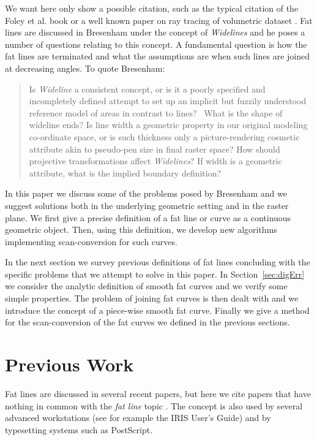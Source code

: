 \documentclass{egpubl}
\begin{document}
We want here only show a possible citation, such as the typical citation of
the Foley et al. book \cite{FolDamFeiHug.etal93} or a well known paper on ray
tracing of volumetric dataset \cite{Lev90}. Fat lines are discussed in
Bresenham under the concept of \emph{Widelines\/} and he poses a number of
questions relating to this concept. A fundamental question is how the fat
lines are terminated and what the assumptions are when such lines are joined
at decreasing angles. To quote Bresenham:
%
\begin{quote}
  Is \emph{Wideline\/} a consistent concept, or is it a poorly specified and
  incompletely defined attempt to set up an implicit but fuzzily understood
  reference model of areas in contrast to lines? \ What is the shape of
  wideline ends? Is line width a geometric property in our original modeling
  co-ordinate space, or is such thickness only a picture-rendering cosmetic
  attribute akin to pseudo-pen size in final raster space? How should
  projective transformations affect \emph{Widelines}? If width is a geometric
  attribute, what is the implied boundary definition?
\end{quote}
In this paper we discuss some of the problems posed by Bresenham and we
suggest solutions both in the underlying geometric setting and in the raster
plane. We first give a precise definition of a fat line or curve as a
continuous geometric object. Then, using this definition, we develop new
algorithms implementing scan-conversion for such curves.

In the next section we survey previous definitions of fat lines concluding
with the specific problems that we attempt to solve in this paper. In
Section~\ref{sec:digErr} we consider the analytic definition of smooth fat
curves and we verify some simple properties. The problem of joining fat
curves is then dealt with and we introduce the concept of a piece-wise smooth
fat curve. Finally we give a method for the scan-conversion of the fat curves
we defined in the previous sections.


\section{Previous Work}

Fat lines are discussed in several recent papers, but here we cite papers
that have nothing in common with the \emph{fat line} topic
\cite{Lev90,FolHagNie93,PorDuf84,RonRos96}. The concept is also used by
several advanced workstations (see for example the IRIS User's Guide) and by
typesetting systems such as PostScript.
\end{document}
